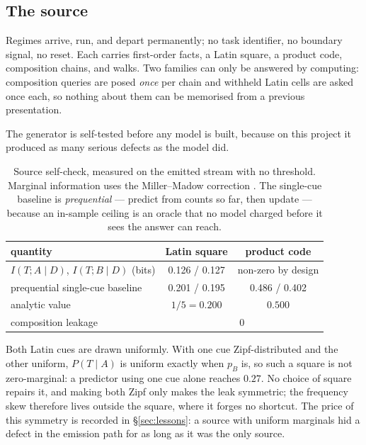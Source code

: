 \documentclass[11pt,a4paper]{article}
\theoremstyle{plain}
\theoremstyle{definition}
\theoremstyle{remark}
\begin{document}
\subsection{The source}
\label{sec:source}

Regimes arrive, run, and depart permanently; no task identifier, no boundary
signal, no reset. Each carries first-order facts, a Latin square, a product
code, composition chains, and walks. Two families can only be answered by
computing: composition queries are posed \emph{once} per chain and withheld
Latin cells are asked once each, so nothing about them can be memorised from a
previous presentation.

The generator is self-tested before any model is built, because on this project
it produced as many serious defects as the model did.

\begin{table}[h]
\centering
\begin{tabular}{lcc}
\toprule
quantity & Latin square & product code \\
\midrule
$I(T;A\mid D)$, $I(T;B\mid D)$ (bits) & 0.126 / 0.127 & non-zero by design \\
prequential single-cue baseline & 0.201 / 0.195 & 0.486 / 0.402 \\
analytic value & $1/5=0.200$ & $0.500$ \\
composition leakage & \multicolumn{2}{c}{0} \\
\bottomrule
\end{tabular}
\caption{Source self-check, measured on the emitted stream with no threshold.
Marginal information uses the Miller--Madow correction \citep{miller1955note}.
The single-cue baseline is \emph{prequential} --- predict from counts so far,
then update --- because an in-sample ceiling is an oracle that no model charged
before it sees the answer can reach.}
\label{tab:source}
\end{table}

Both Latin cues are drawn uniformly. With one cue Zipf-distributed and the other
uniform, $P(T\mid A)$ is uniform exactly when $p_B$ is, so such a square is not
zero-marginal: a predictor using one cue alone reaches $0.27$. No choice of
square repairs it, and making both Zipf only makes the leak symmetric; the
frequency skew therefore lives outside the square, where it forges no shortcut.
The price of this symmetry is recorded in \S\ref{sec:lessons}: a source with
uniform marginals hid a defect in the emission path for as long as it was the
only source.
\end{document}
